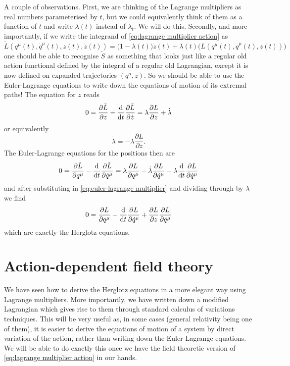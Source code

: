 \documentclass[../main.tex]{subfiles}
\begin{document}
A couple of observations. First, we are thinking of the Lagrange multipliers as real
numbers parameterised by \( t \), but we could equivalently think of them as a function of
\( t \) and write \( \lambda(t) \) instead of \( \lambda_t \). We will do this. Secondly,
and more importantly, if we write the integrand of \cref{eq:lagrange multiplier action} as
\begin{equation*}
	\tilde{L}(q^\mu(t), \dot{q}^\mu(t), z(t), \dot{z}(t)) = \big(1 - \lambda(t)\big) \dot{z}(t) +
	\lambda(t)\big(L(q^\mu(t), \dot{q}^\mu(t), z(t))\big)
\end{equation*}
one should be able to recognise \( \tilde{S} \) as something that looks just like a
regular old action functional defined by the integral of a regular old Lagrangian, except
it is now defined on expanded trajectories \( (q^\mu, z) \). So we should be able to use
the Euler-Lagrange equations to write down the equations of motion of its extremal paths!
The equation for \( z \) reads
\begin{equation*}
	0 = \frac{\partial \tilde{L}}{\partial z} - \frac{\mathrm{d}}{\mathrm{d} t} \frac{\partial
	\tilde{L}}{\partial \dot{z}} = \lambda \frac{\partial L}{\partial z} + \dot{\lambda}
\end{equation*}
or equivalently
\begin{equation} \label{eq:euler-lagrange multiplier}
	\dot{\lambda} = -\lambda \frac{\partial L}{\partial z}. 
\end{equation}
The Euler-Lagrange equations for the positions then are
\begin{equation*}
	0 = \frac{\partial \tilde{L}}{\partial q^\mu} - \frac{\mathrm{d}}{\mathrm{d} t} \frac{\partial
	\tilde{L}}{\partial \dot{q}^\mu} = \lambda \frac{\partial L}{\partial q^\mu} -
	\dot{\lambda}\frac{\partial L}{\partial \dot{q}^\mu} - \lambda \frac{\mathrm{d}}{\mathrm{d}
	t}\frac{\partial L}{\partial \dot{q}^\mu}
\end{equation*}
and after substituting in \cref{eq:euler-lagrange multiplier} and dividing through by \(
\lambda \) we find
\begin{equation} \label{eq:euler-lagrange positions}
	0 = \frac{\partial L}{\partial q^\mu} - \frac{\mathrm{d}}{\mathrm{d} t} \frac{\partial L}{\partial
	\dot{q}^\mu} + \frac{\partial L}{\partial z}\frac{\partial L}{\partial \dot{q}^\mu}
\end{equation}
which are exactly the Herglotz equations. 

\section{Action-dependent field theory}
We have seen how to derive the Herglotz equations in a more elegant way using Lagrange
multipliers. More importantly, we have written down a modified Lagrangian which gives rise
to them through standard calculus of variations techniques. This will be very useful as,
in some cases (general relativity being one of them), it is easier to derive the equations
of motion of a system by direct variation of the action, rather than writing down the
Euler-Lagrange equations. We will be able to do exactly this once we have the field
theoretic version of \cref{eq:lagrange multiplier action} in our hands.
\end{document}
